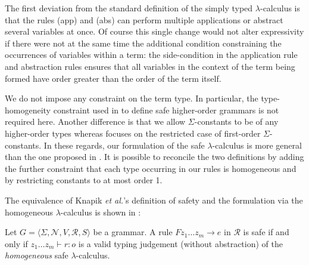 \documentclass{llncs}
\begin{document}
The first deviation from the standard definition of the simply typed $\lambda$-calculus is that the rules {\sf (app)} and {\sf (abs)}
can perform multiple applications or abstract several variables at once.
Of course this single change would not alter expressivity if there were not at the same time the additional condition
constraining the occurrences of variables within a term:  the side-condition in the application rule and abstraction rules ensures that all variables in the context of the term being formed have order greater than the order of the term itself.


We do not impose any constraint on the term type. In particular, the type-homogeneity constraint used in \cite{KNU02} to define safe higher-order grammars is not required here. Another difference is that we allow $\Sigma$-constants to be of any higher-order types whereas \cite{KNU02} focuses on the restricted case of first-order $\Sigma$-constants.
In these regards, our formulation of the safe $\lambda$-calculus is more general than the one proposed in \cite{safety-mirlong2004}.
It is possible to reconcile the two definitions by adding the further constraint that each type occurring in our rules is homogeneous
and by restricting constants to at most order 1.

The equivalence of Knapik \emph{et al.}'s definition of safety and
the formulation via the homogeneous $\lambda$-calculus is shown in \cite{demirandathesis}:
\begin{proposition} Let $G = \langle \Sigma, \mathcal{N}, V, \mathcal{R}, S \rangle$ be a grammar.
A rule $F z_1 \ldots z_m \rightarrow e$ in $\mathcal{R}$ is safe if and only if
$ z_1 \ldots z_m \vdash r : o$
is a valid typing judgement (without abstraction) of the \emph{homogeneous} safe $\lambda$-calculus.
\end{proposition}
\end{document}
